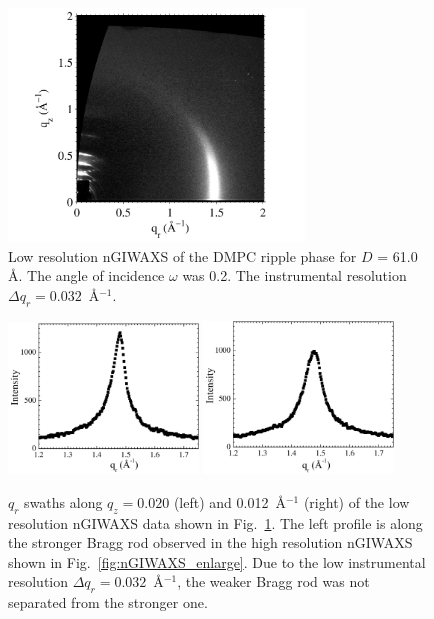 \begin{figure}[htbp]
  \centering
  \includegraphics[width=0.7\textwidth]{figures/ripple/nGIWAXS/ripple_waxs_low-res}
  \caption[Low resolution nGIWAXS of the DMPC ripple phase for $D$ = 61.0 \AA]
  {Low resolution nGIWAXS of the DMPC ripple phase for $D$ = 61.0 \AA.
  The angle of incidence $\omega$ was 0.2\textdegree. 
  The instrumental resolution $\Delta q_r=0.032$~\AA$^{-1}$.}
  \label{fig:ripple_waxs_low-res}
\end{figure}

\begin{figure}[htbp]
  \centering
  \includegraphics[width=0.45\textwidth]{figures/ripple/nGIWAXS/ripple_waxs_low-res_strong}
  \includegraphics[width=0.45\textwidth]{figures/ripple/nGIWAXS/ripple_waxs_low-res_weak}
  \caption[$q_r$ swaths along $q_z=0.020$ (left) and 0.012~\AA$^{-1}$ (right) 
  of the low resolution nGIWAXS data shown in Fig.~\ref{fig:ripple_waxs_low-res}]
  {$q_r$ swaths along $q_z=0.020$ (left) and 0.012~\AA$^{-1}$ (right) 
  of the low resolution nGIWAXS data shown in Fig.~\ref{fig:ripple_waxs_low-res}.
  The left profile is along the stronger Bragg rod observed in the high resolution 
  nGIWAXS shown in Fig.~\ref{fig:nGIWAXS_enlarge}. Due to the low
  instrumental resolution $\Delta q_r=0.032$~\AA$^{-1}$, the weaker
  Bragg rod was not separated from the stronger one.} 
  \label{fig:ripple_waxs_low-res_qrplots}
\end{figure}

